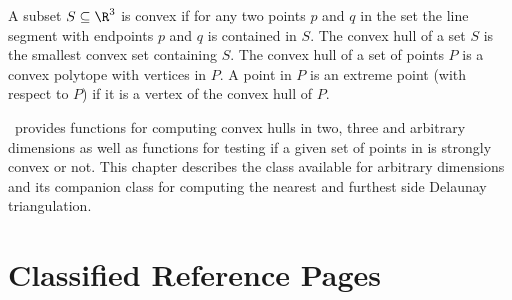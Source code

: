 
\label{chap:convex_hull_d_ref}

A subset $S \subseteq \R^3$ is convex if for any two points $p$ and $q$
in the set the line segment with endpoints $p$ and $q$ is contained
in $S$. The convex hull of a set $S$ is 
the smallest convex set containing
$S$. The convex hull of a set of points $P$ is a convex 
polytope with vertices in $P$.  A point in $P$ is an extreme point 
(with respect to $P$) if it is a vertex 
of the convex hull of $P$.

\cgal\ provides functions for computing convex hulls in two, three 
and arbitrary dimensions as well as functions for testing if a given set of 
points in is strongly convex or not.  This chapter describes the class
available for arbitrary dimensions and its companion class for 
computing the nearest and furthest side Delaunay triangulation. 

\section{Classified Reference Pages}


 \\
 \\
 \\


 \\
  \\

\clearpage


